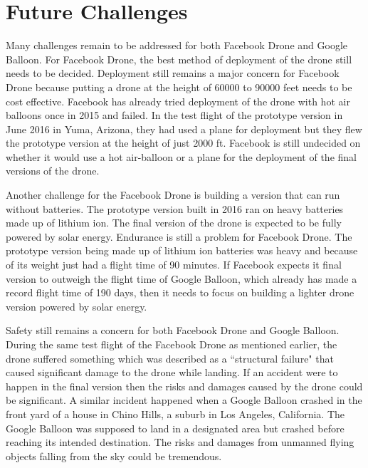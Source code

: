 \documentclass{llncs}
\begin{document}
	\section{Future Challenges}
	Many challenges remain to be addressed for both Facebook Drone and Google Balloon. 
	For Facebook Drone, the  best method of deployment of the drone still needs to be decided. 
	Deployment still remains a major concern for Facebook Drone because putting a drone at the height of
	60000 to 90000 feet needs to be cost effective. Facebook has already tried deployment of the drone 
	with hot air balloons once in 2015 and failed. In the test flight of the prototype version in 
	June 2016 in Yuma, Arizona, they had used a plane for deployment but they flew the prototype version at the
	height
	of just 2000 ft\cite{drone_test_flights}. Facebook is still undecided on whether it would use a hot air-balloon or a plane for the 
	deployment of the final versions of the drone. 
	
	Another challenge for the Facebook Drone is building
	a version that can run without batteries. The prototype version built in 2016 ran on heavy batteries 
	made up of lithium ion. The final version of the drone is expected to be fully powered by solar 
	energy. Endurance is still a problem for Facebook Drone. The prototype version being made up of 
	lithium ion batteries was heavy and because of its weight just had a flight time of 90 minutes. 
	If Facebook expects it final version to outweigh the flight time of Google Balloon, which already has 
	made a record flight time of 190 days, then it needs to focus on building a lighter drone version 
	powered by solar energy. 
	
	Safety still remains a concern for both Facebook Drone and Google Balloon. 
	During the same test flight of the Facebook Drone as mentioned earlier, the drone suffered something
	which was described as a ``structural failure" that caused significant damage to the drone while 
	landing. If an accident were to happen in the final version then the risks and damages caused by the 
	drone could be significant. A similar incident happened when a Google Balloon crashed in the front 
	yard of a house in Chino Hills, a suburb in Los Angeles, California\cite{balloon_crash}. The Google Balloon was supposed
	to land in a designated area but crashed before reaching its intended destination. The risks and 
	damages from unmanned flying objects falling from the sky could be tremendous. 
	     
\end{document}
